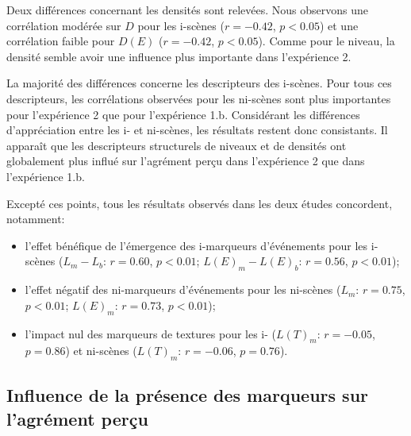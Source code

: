 Deux différences concernant les densités sont relevées. Nous observons une corrélation modérée sur $D$ pour les i-scènes ($r=-0.42$, $p<0.05$) et une corrélation faible pour $D(E)$ ($r=-0.42$, $p<0.05$). Comme pour le niveau, la densité semble avoir une influence plus importante dans l'expérience 2. 

La majorité des différences concerne les descripteurs des i-scènes. Pour tous ces descripteurs, les corrélations observées pour les ni-scènes sont plus importantes pour l'expérience 2 que pour l'expérience 1.b. Considérant les différences d'appréciation entre les i- et ni-scènes, les résultats restent donc consistants. Il apparaît que les descripteurs structurels de niveaux et de densités ont globalement plus influé sur l'agrément perçu dans l'expérience 2 que dans l'expérience 1.b.

Excepté ces points, tous les résultats observés dans les deux études concordent, notamment:

\begin{itemize}
\item l'effet bénéfique de l'émergence des i-marqueurs d'événements pour les i-scènes ($L_m-L_b$: $r=0.60$, $p<0.01$; $L(E)_m-L(E)_b$: $r=0.56$, $p<0.01$);
\item l'effet négatif des ni-marqueurs d'événements pour les ni-scènes ($L_m$: $r=0.75$, $p<0.01$; $L(E)_m$: $r=0.73$, $p<0.01$);
\item l'impact nul des marqueurs de textures pour les i- ($L(T)_m$: $r=-0.05$, $p=0.86$) et ni-scènes ($L(T)_m$: $r=-0.06$, $p=0.76$).
\end{itemize}


\subsection{Influence de la présence des marqueurs sur l'agrément perçu}
\label{sec:ch5_Asujet}

